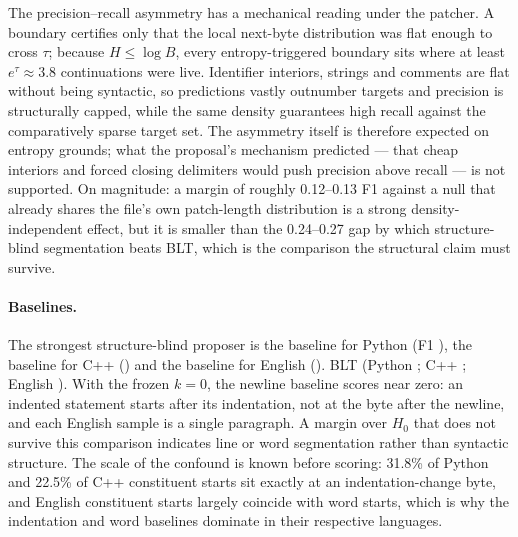 The precision--recall asymmetry has a mechanical reading under the patcher. A boundary certifies only that the local next-byte distribution was flat enough to cross $\tau$; because $H\le\log B$, every entropy-triggered boundary sits where at least $e^{\tau}\approx3.8$ continuations were live. Identifier interiors, strings and comments are flat without being syntactic, so predictions vastly outnumber targets and precision is structurally capped, while the same density guarantees high recall against the comparatively sparse target set. The asymmetry itself is therefore expected on entropy grounds; what the proposal's mechanism predicted --- that cheap interiors and forced closing delimiters would push precision above recall --- is not supported. On magnitude: a margin of roughly 0.12--0.13 F1 against a null that already shares the file's own patch-length distribution is a strong density-independent effect, but it is smaller than the 0.24--0.27 gap by which structure-blind segmentation beats BLT, which is the comparison the structural claim must survive.

\TableBaselines
\paragraph{Baselines.} The strongest structure-blind proposer is the \StrongestPy{} baseline for Python (F1 \StrongestFonePy{}), the \StrongestCpp{} baseline for C++ (\StrongestFoneCpp{}) and the \StrongestEn{} baseline for English (\StrongestFoneEn{}). BLT \RTwoAll{} (Python \VsBasePy{} \VsBaseCIPy{}; C++ \VsBaseCpp{} \VsBaseCICpp{}; English \VsBaseEn{} \VsBaseCIEn{}). With the frozen $k=0$, the newline baseline scores near zero: an indented statement starts after its indentation, not at the byte after the newline, and each English sample is a single paragraph. A margin over $H_0$ that does not survive this comparison indicates line or word segmentation rather than syntactic structure. The scale of the confound is known before scoring: 31.8\% of Python and 22.5\% of C++ constituent starts sit exactly at an indentation-change byte, and English constituent starts largely coincide with word starts, which is why the indentation and word baselines dominate in their respective languages.

